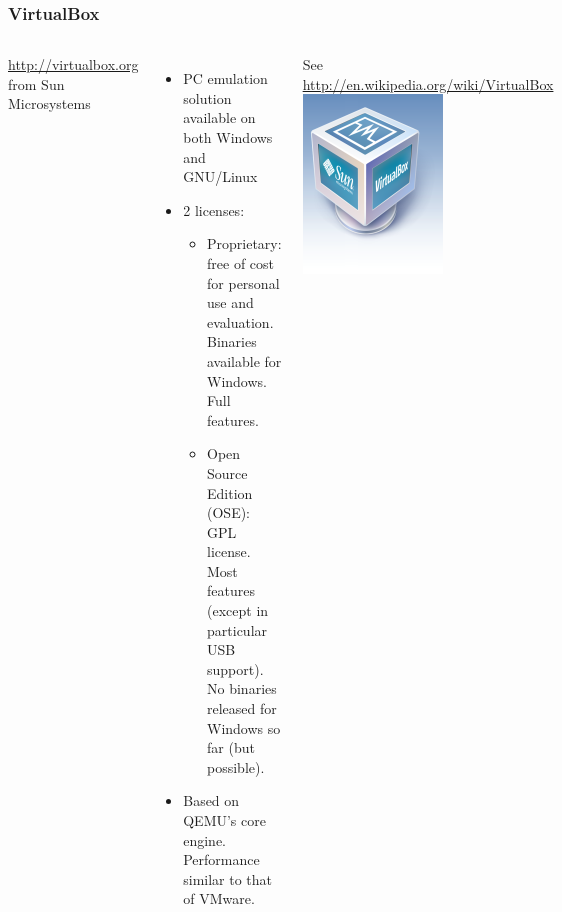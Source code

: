 \begin{frame}
  \frametitle{VirtualBox}
  \begin{columns}[T]
    \url{http://virtualbox.org} from Sun Microsystems
    \begin{itemize}
    \item PC emulation solution available on both Windows and GNU/Linux
    \item 2 licenses:
      \begin{itemize}
      \item Proprietary: free of cost for personal use and evaluation.\\
        Binaries available for Windows. Full features.
      \item Open Source Edition (OSE): GPL license.\\
        Most features (except in particular USB support).\\
        No binaries released for Windows so far (but possible).
      \end{itemize}
    \item Based on QEMU's core engine. Performance similar to that of
      VMware.
    \end{itemize}
    See \url{http://en.wikipedia.org/wiki/VirtualBox}
    \includegraphics[width=\textwidth]{slides/sysdev-application-development/virtualbox.png}
  \end{columns}
\end{frame}
